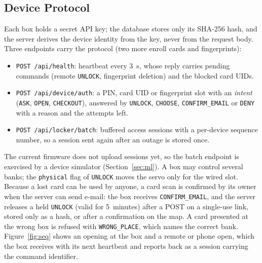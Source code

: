 \subsection{Device Protocol}

Each box holds a secret API key; the database stores only its SHA-256 hash, and the server derives the device
identity from the key, never from the request body. Three endpoints carry the protocol (two more enroll cards and
fingerprints):
\begin{itemize}
  \item \texttt{POST /api/health}: heartbeat every 3~s, whose reply carries pending commands (remote
        \texttt{UNLOCK}, fingerprint deletion) and the blocked card UIDs.
  \item \texttt{POST /api/device/auth}: a PIN, card UID or fingerprint slot with an \emph{intent} (\texttt{ASK},
        \texttt{OPEN}, \texttt{CHECKOUT}), answered by \texttt{UNLOCK}, \texttt{CHOOSE}, \texttt{CONFIRM\_EMAIL} or
        \texttt{DENY} with a reason and the attempts left.
  \item \texttt{POST /api/locker/batch}: buffered access sessions with a per-device sequence number, so a session sent
        again after an outage is stored once.
\end{itemize}
The current firmware does not upload sessions yet, so the batch endpoint is exercised by a device simulator
(Section~\ref{sec:ml}). A box may control several banks; the \texttt{physical} flag of \texttt{UNLOCK} moves the servo only for
the wired slot. Because a lost card can be used by anyone, a card scan is confirmed by its owner when the server can
send e-mail: the box receives \texttt{CONFIRM\_EMAIL}, and the server releases a held \texttt{UNLOCK} (valid for
5~minutes) after a POST on a single-use link, stored only as a hash, or after a confirmation on the map. A card
presented at the wrong box is refused with \texttt{WRONG\_PLACE}, which names the correct bank. Figure~\ref{fig:seq}
shows an opening at the box and a remote or phone open, which the box receives with its next heartbeat and reports
back as a session carrying the command identifier.

